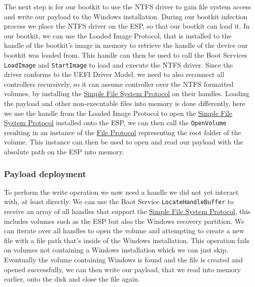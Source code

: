 The next step is for our bootkit to use the \ac{NTFS} driver to gain file system access and write our payload to the Windows installation.
During our bootkit infection process we place the \ac{NTFS} driver on the \ac{ESP}, so that our bootkit can load it.
In our bootkit, we can use the Loaded Image Protocol, that is installed to the handle of the bootkit's image in memory to retrieve the handle of the device our bootkit was loaded from\cite[9.1 EFI Loaded Image Protocol]{uefi-spec}.
This handle can then be used to call the Boot Services \lstinline{LoadImage} and \lstinline{StartImage} to load and execute the NTFS driver.
Since the driver conforms to the UEFI Driver Model, we need to also reconnect all controllers recursively, so it can assume controller over the NTFS formatted volumes, by installing the \hyperref[lst:simple-file-system-protocol]{Simple File System Protocol} on their handles.
Loading the payload and other non-executable files into memory is done differently, here we use the handle from the Loaded Image Protocol to open the \hyperref[lst:simple-file-system-protocol]{Simple File System Protocol} installed onto the \ac{ESP}, we can then call the \lstinline{OpenVolume} resulting in an instance of the \hyperref[lst:simple-file-system-protocol]{File Protocol} representing the root folder of the volume\cite[13.4]{uefi-spec}.
This instance can then be used to open and read our payload with the absolute path on the \ac{ESP} into memory.

\subsubsection{Payload deployment}

To perform the write operation we now need a handle we did not yet interact with, at least directly.
We can use the Boot Service \lstinline{LocateHandleBuffer} to receive an array of all handles that support the \hyperref[lst:simple-file-system-protocol]{Simple File System Protocol}, this includes volumes such as the \ac{ESP} but also the Windows recovery partition.
We can iterate over all handles to open the volume and attempting to create a new file with a file path that's inside of the Windows installation.
This operation fails on volumes not containing a Windows installation which we can just skip.
Eventually the volume containing Windows is found and the file is created and opened successfully, we can then write our payload, that we read into memory earlier, onto the disk and close the file again.

